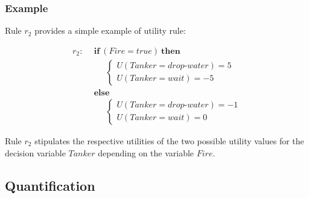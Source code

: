 \subsubsection*{Example}

Rule $r_2$ provides a simple example of utility rule:

\begin{align*}
r_2: \ \ & \textbf{if} \ (\mathit{Fire}\!=\!\mathit{true}) \ \textbf{then} \\
& \;\;\;\;\;  \begin{cases}
U(\mathit{Tanker}\!=\!\mathit{drop\mbox{-}water}) = 5 \\
U(\mathit{Tanker}\!=\!\mathit{wait}) = -5
\end{cases} \\
& \textbf{else} \\
& \;\;\;\;\; \begin{cases}
U (\mathit{Tanker}\!=\!\mathit{drop\mbox{-}water}) = -1 \\
U(\mathit{Tanker}\!=\!\mathit{wait}) = 0
\end{cases}
\end{align*}

Rule $r_2$ stipulates the respective utilities of the two possible utility values for the decision variable $\mathit{Tanker}$ depending on the variable $\mathit{Fire}$. 

\subsection{Quantification}
\label{sec:quantification}

